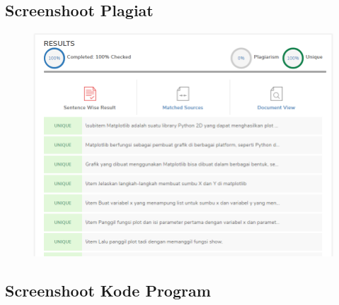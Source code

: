 		\subsection{Screenshoot Plagiat}
		\begin{figure}[H]
			\includegraphics[width=12cm]{figures/chapter6/1174057/plagiarisme.png}
			\centering
		\end{figure}
		
		\subsection{Screenshoot Kode Program}
		
